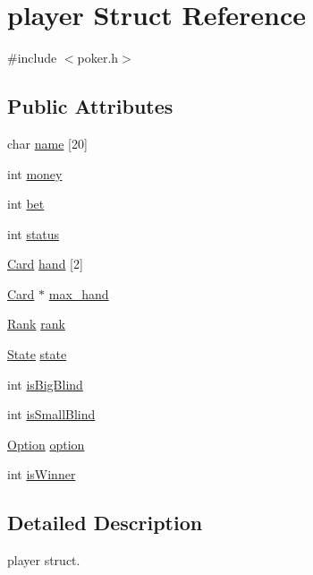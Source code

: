 \hypertarget{structplayer}{\section{player Struct Reference}
\label{structplayer}
}


{\ttfamily \#include $<$poker.\+h$>$}

\subsection*{Public Attributes}
\begin{DoxyCompactItemize}
\item 
char \hyperlink{structplayer_a284acbcfa653b66a860783f6d2b33e0d}{name} \mbox{[}20\mbox{]}
\item 
int \hyperlink{structplayer_af29ec89834ba3675a99b4008b10422f2}{money}
\item 
int \hyperlink{structplayer_a0c5838d28a03958d82094cee91d73cd8}{bet}
\item 
int \hyperlink{structplayer_a79aedffc8c59ba13e1b882d3066fd8a9}{status}
\item 
\hyperlink{demo_8c_aacb186b77382a02f7317dc38797f37c2}{Card} \hyperlink{structplayer_ac8ad7a367cbc23ff4a83c28726cfe0eb}{hand} \mbox{[}2\mbox{]}
\item 
\hyperlink{demo_8c_aacb186b77382a02f7317dc38797f37c2}{Card} $\ast$ \hyperlink{structplayer_a909dfff6c4158a7aa0a6fcc23f96d319}{max\+\_\+hand}
\item 
\hyperlink{demo_8c_a0991367a2e93f69582a2258ea315e261}{Rank} \hyperlink{structplayer_a9cfae91cf808c1b7518f48508865b29f}{rank}
\item 
\hyperlink{demo_8c_ad958b7c6a5231ab463ca88ad172b5f46}{State} \hyperlink{structplayer_ac23f62455d34a7b5d841b7e93284ee14}{state}
\item 
int \hyperlink{structplayer_aa29010f77b5955ef3a0d9cc59b13699a}{is\+Big\+Blind}
\item 
int \hyperlink{structplayer_a00d758277154f5f7990db0f2d849586a}{is\+Small\+Blind}
\item 
\hyperlink{demo_8c_a16be381f8120dd9d0d4437c22d12a602}{Option} \hyperlink{structplayer_abc56330c6c862a2882721f2f9aac226e}{option}
\item 
int \hyperlink{structplayer_ae3ed3af8f14bfaec499bac6ce8b6767f}{is\+Winner}
\end{DoxyCompactItemize}


\subsection{Detailed Description}
player struct. 

